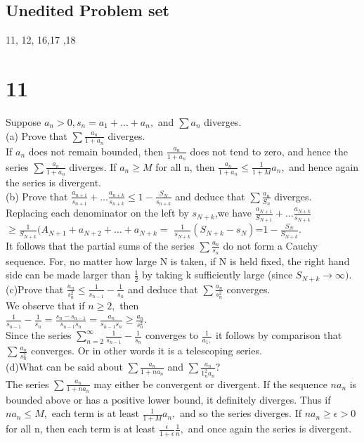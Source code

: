 \subsection*{Unedited Problem set}
11, 12, 16,17 ,18
\section*{11}
Suppose $a_n > 0, s_n =a_1 + \dots +a_n,$ and $\sum a_n$ diverges. \\ 
(a) Prove that $\sum \frac{a_n}{1+a_n}$ diverges. \\ 
If $a_n$ does not remain bounded, then $\frac{a_n}{1+a_n}$ does not tend to zero, and hence the series $\sum \frac{a_n}{1+a_n}$ diverges. If $a_n \geq M$ for all n, then $\frac{a_n}{1+a_n}\leq \frac{1}{1+M}a_n,$ and hence again the series is divergent. \\ 
(b) Prove that $\frac{a_{n+1}}{s_{n+1}}+ \dots \frac{a_{n+k}}{s_{n+k}} \leq 1- \frac{S_N}{s_{n+k}}$ and deduce that $\sum \frac{a_n}{S_n}$ diverges. \\
Replacing each denominator on the left by $s_{N+k}$,we have $\frac{a_{N+1}}{S_{N+1}}+ \dots \frac{a_{N+k}}{s_{N+k}}$ $\geq \frac{1}{S_{N+k}}(A_{N+1}+a_{N+2}+ \dots +a_{N+k}=$  $\frac{1}{s_{N+k}}(S_{N+k}-s_N)$=$1-\frac{S_N}{S_{N+k}}$.\\ 
It follows that the partial sums of the series $\sum \frac{a_n}{s_n}$ do not form a Cauchy sequence. For, no matter how large N is taken, if N is held fixed, the right hand side can be made larger than $\frac{1}{2}$ by taking k sufficiently large (since $S_{N+k} \longrightarrow \infty ).$
(c)Prove that $\frac{a_n}{s_n^2}\leq \frac{1}{s_{n-1}}-\frac{1}{s_n}$ and deduce that $\sum \frac{a_n}{s_n^2}$ converges. \\ 
We observe that if $n \geq 2,$ then \\ 
$\frac{1}{s_{n-1}}-\frac{1}{s_n}=\frac{s_n -s_{n-1}}{s_{n-1}s_n}= \frac{a_n}{s_{n-1}s_n}\geq \frac{a_n}{s_n^2}.$\\ 
Since the series $\sum_{n=2}^\infty \frac{1}{s_{n-1}}-\frac{1}{s_n}$ converges to $\frac{1}{a_1,}$ it follows by comparison that $\sum \frac{a_n}{s_n^2}$ converges. Or in other words it is a telescoping series.\\ 
(d)What can be said about $\sum \frac{a_n}{1+na_n}$ and $\sum \frac{a_n}{1_n^2 a_n}$?\\ 
The series $\sum \frac{a_n}{1+na_n}$ may either be convergent or divergent. If the sequence ${na_n}$ is bounded above or has a positive lower bound, it definitely diverges. Thus if $na_n \leq M,$ each term is at least $\frac{1}{1+M}a_n,$ and so the series diverges. If $na_n \geq \epsilon >0$ for all n, then each term is at least $\frac{\epsilon}{1+\epsilon}\frac{1}{n},$ and once again the series is divergent. \\ 
